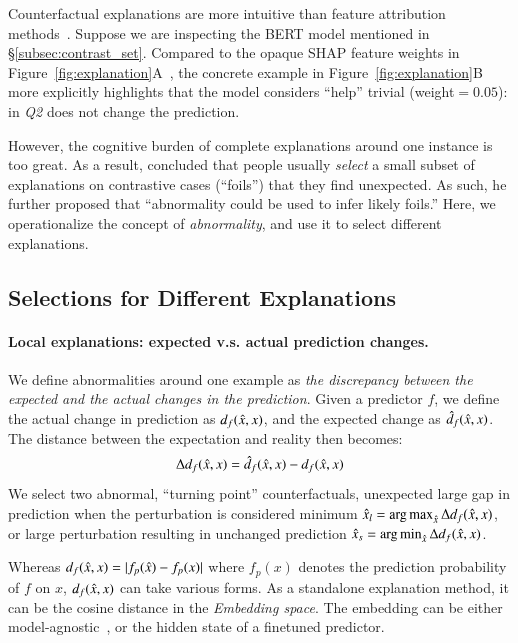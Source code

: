 Counterfactual explanations are more intuitive than feature attribution methods~\cite{miller}.
Suppose we are inspecting the \qqp BERT model mentioned in \S\ref{subsec:contrast_set}.
Compared to the opaque SHAP feature weights in Figure~\ref{fig:explanation}A~\cite{NIPS2017_7062}, the concrete example in Figure~\ref{fig:explanation}B more explicitly highlights that the model considers ``help'' trivial (weight$=0.05$): 
 in \emph{Q2} does not change the prediction.

However, the cognitive burden of complete explanations around one instance is too great.
As a result, \citet{miller} concluded that people usually \emph{select} a small subset of explanations on contrastive cases (``foils'') that they find unexpected. 
As such, he further proposed that ``abnormality could be used to infer likely foils.''
Here, we operationalize the concept of \emph{abnormality}, and use it to select different explanations.


\subsection{Selections for Different Explanations}

\paragraph{Local explanations: expected v.s. actual prediction changes.}

We define abnormalities around one example as \emph{the discrepancy between the expected and the actual changes in the prediction}.
Given a predictor $f$, we define the actual change in prediction as $d_f(\hat{x}, x)$, and the expected change as $\hat{d}_f(\hat{x}, x)$.
The distance between the expectation and reality then becomes:
$$\Delta d_f(\hat{x}, x) = \hat{d}_f(\hat{x}, x)-d_f(\hat{x}, x)$$
We select two abnormal, ``turning point'' counterfactuals, \ie unexpected large gap in prediction when the perturbation is considered minimum $\hat{x}_l = \operatorname*{arg\,max}_{\hat{x}} \Delta d_f(\hat{x}, x)$, or large perturbation resulting in unchanged prediction $\hat{x}_s = \operatorname*{arg\,min}_{\hat{x}} \Delta d_f(\hat{x}, x)$.

Whereas $d_f(\hat{x}, x)=|f_p(\hat{x})-f_p(x)|$ where $f_p(x)$ denotes the prediction probability of $f$ on $x$, $d_f(\hat{x}, x)$ can take various forms. 
As a standalone explanation method, it can be the cosine distance in the \emph{Embedding space}.
The embedding can be either model-agnostic~\cite{reimers-2019-sentence-bert}, or the hidden state of a finetuned predictor.

